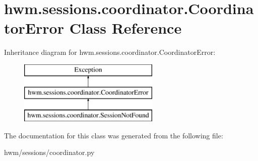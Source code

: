 \hypertarget{classhwm_1_1sessions_1_1coordinator_1_1_coordinator_error}{\section{hwm.\-sessions.\-coordinator.\-Coordinator\-Error Class Reference}
\label{classhwm_1_1sessions_1_1coordinator_1_1_coordinator_error}
}
Inheritance diagram for hwm.\-sessions.\-coordinator.\-Coordinator\-Error\-:\begin{figure}[H]
\begin{center}
\leavevmode
\includegraphics[height=3.000000cm]{classhwm_1_1sessions_1_1coordinator_1_1_coordinator_error}
\end{center}
\end{figure}


The documentation for this class was generated from the following file\-:\begin{DoxyCompactItemize}
\item 
hwm/sessions/coordinator.\-py\end{DoxyCompactItemize}

